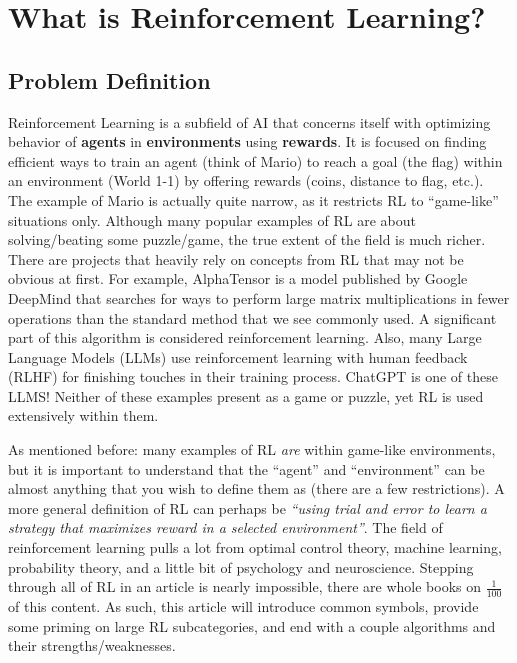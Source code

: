 \section{What is Reinforcement Learning?}
\subsection{Problem Definition}
\begin{flushleft}
    \large Reinforcement Learning is a subfield of AI that concerns itself with optimizing behavior of \textbf{agents} in \textbf{environments} using \textbf{rewards}. It is focused on finding efficient ways to train an agent (think of Mario) to reach a goal (the flag) within an environment (World 1-1) by offering rewards (coins, distance to flag, etc.). The example of Mario is actually quite narrow, as it restricts RL to ``game-like'' situations only. Although many popular examples of RL are about solving/beating some puzzle/game, the true extent of the field is much richer. There are projects that heavily rely on concepts from RL that may not be obvious at first. For example, AlphaTensor is a model published by Google DeepMind that searches for ways to perform large matrix multiplications in fewer operations than the standard method that we see commonly used. A significant part of this algorithm is considered reinforcement learning. Also, many Large Language Models (LLMs) use reinforcement learning with human feedback (RLHF) for finishing touches in their training process. ChatGPT is one of these LLMS! Neither of these examples present as a game or puzzle, yet RL is used extensively within them. \break
    
    As mentioned before: many examples of RL \textit{are} within game-like environments, but it is important to understand that the ``agent'' and ``environment'' can be almost anything that you wish to define them as (there are a few restrictions). A more general definition of RL can perhaps be \textit{``using trial and error to learn a strategy that maximizes reward in a selected environment''}. The field of reinforcement learning pulls a lot from optimal control theory, machine learning, probability theory, and a little bit of psychology and neuroscience. Stepping through all of RL in an article is nearly impossible, there are whole books on $\frac{1}{100}$ of this content. As such, this article will introduce common symbols, provide some priming on large RL subcategories, and end with a couple algorithms and their strengths/weaknesses.
\end{flushleft}

